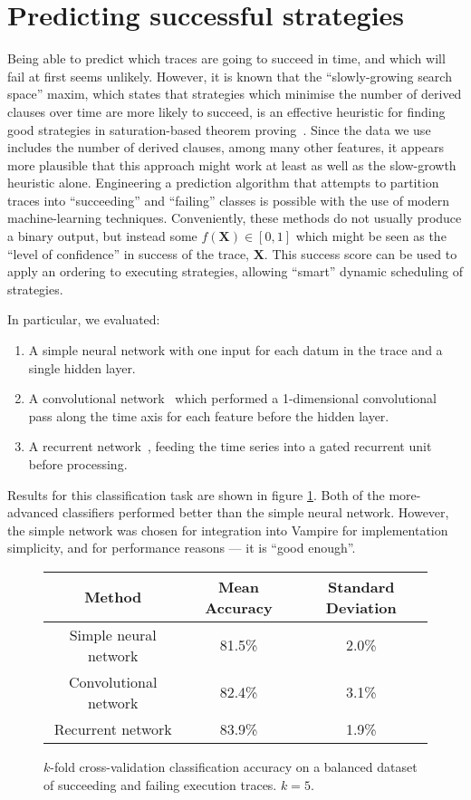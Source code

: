 \documentclass{scrartcl}
\begin{document}
\section{Predicting successful strategies}
Being able to predict which traces are going to succeed in time, and which will fail at first seems unlikely.
However, it is known that the ``slowly-growing search space'' maxim, which states that strategies which minimise the number of derived clauses over time are more likely to succeed, is an effective heuristic for finding good strategies in saturation-based theorem proving~\cite{predict-success}.
Since the data we use includes the number of derived clauses, among many other features, it appears more plausible that this approach might work at least as well as the slow-growth heuristic alone.
Engineering a prediction algorithm that attempts to partition traces into ``succeeding'' and ``failing'' classes is possible with the use of modern machine-learning techniques.
Conveniently, these methods do not usually produce a binary output, but instead some \(f(\mathbf{X}) \in \left[0, 1\right]\) which might be seen as the ``level of confidence'' in success of the trace, \(\mathbf{X}\).
This success score can be used to apply an ordering to executing strategies, allowing ``smart'' dynamic scheduling of strategies.

In particular, we evaluated:
\begin{enumerate}
	\item A simple neural network with one input for each datum in the trace and a single hidden layer.
	\item A convolutional network~\cite{cnn} which performed a 1-dimensional convolutional pass along the time axis for each feature before the hidden layer.
	\item A recurrent network~\cite{gru}, feeding the time series into a gated recurrent unit before processing.
\end{enumerate}
Results for this classification task are shown in figure \ref{fig:xvalidation}.
Both of the more-advanced classifiers performed better than the simple neural network.
However, the simple network was chosen for integration into Vampire for implementation simplicity, and for performance reasons --- it is ``good enough''.

\begin{figure}
	\centering
	\begin{tabular}{c c c}
		Method & Mean Accuracy & Standard Deviation\\
		\hline
		Simple neural network & 81.5\% & 2.0\%\\
		Convolutional network & 82.4\% & 3.1\%\\
		Recurrent network & 83.9\% & 1.9\%\\
	\end{tabular}
	\caption{\(k\)-fold cross-validation classification accuracy on a balanced dataset of succeeding and failing execution traces. \(k=5\).}
	\label{fig:xvalidation}
\end{figure}
\end{document}
